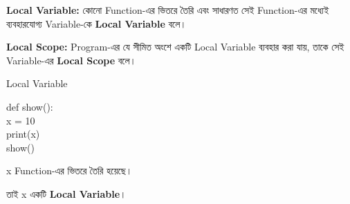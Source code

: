 
\begin{definitionbox}

\textbf{Local Variable:}
কোনো Function-এর ভিতরে তৈরি এবং সাধারণত সেই Function-এর
মধ্যেই ব্যবহারযোগ্য Variable-কে \textbf{Local Variable} বলে।

\medskip

\textbf{Local Scope:}
Program-এর যে সীমিত অংশে একটি Local Variable ব্যবহার করা যায়,
তাকে সেই Variable-এর \textbf{Local Scope} বলে।

\end{definitionbox}

\begin{codeoutputbox}{Local Variable}

\noindent
\begin{minipage}[t]{0.52\linewidth}
\codeheading

\begin{english}
\ttfamily
def show():\\
\hspace*{4mm}x = 10\\
\hspace*{4mm}print(x)\\[0.5mm]
show()
\end{english}

\end{minipage}
\hfill
\begin{minipage}[t]{0.44\linewidth}
\outputheading

\begin{center}
\textenglish{}
\end{center}

\textenglish{\ttfamily x}
Function-এর ভিতরে তৈরি হয়েছে।

তাই
\textenglish{\ttfamily x}
একটি \textbf{Local Variable}।

\end{minipage}

\end{codeoutputbox}


